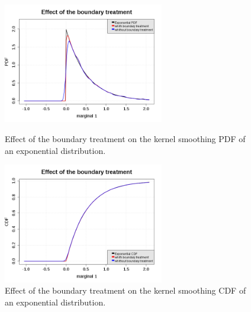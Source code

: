              \begin{figure}[H]
               \begin{minipage}{7cm}
                 \begin{center}
                   \includegraphics[width=7cm]{Figures/kernelSmoothing_boundary_pdf.png}
                   \caption{Effect of the boundary treatment on the kernel smoothing PDF of an exponential distribution.}
                   \label{pdf_KernelSmooth_boundary}
                 \end{center}
               \end{minipage}
               \hfill
               \begin{minipage}{7cm}
                 \begin{center}
                   \includegraphics[width=7cm]{Figures/kernelSmoothing_boundary_cdf.png}
                   \caption{Effect of the boundary treatment on the kernel smoothing CDF of an exponential distribution.}
                   \label{cdf_KernelSmooth_boundary}
                 \end{center}
               \end{minipage}
             \end{figure}
